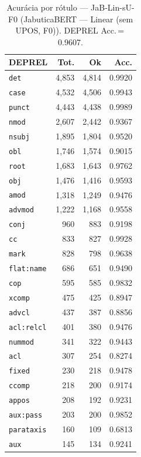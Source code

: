 \begin{table}[ht]
\centering
\caption{Acurácia por rótulo --- JaB-Lin-sU-F0 (JabuticaBERT — Linear (sem UPOS, F0)). DEPREL Acc.\,=\,0.9607.}
\label{tab:acc-predict-test-ablacao-linear-amadeusai-modernJabuticaBERT-Base-1k-fold0}
\scriptsize
\begin{tabular}{lrrr}
\toprule
\textbf{DEPREL} & \textbf{Tot.} & \textbf{Ok} & \textbf{Acc.} \\
\midrule
\texttt{det} & 4,853 & 4,814 & 0.9920 \\
\texttt{case} & 4,532 & 4,506 & 0.9943 \\
\texttt{punct} & 4,443 & 4,438 & 0.9989 \\
\texttt{nmod} & 2,607 & 2,442 & 0.9367 \\
\texttt{nsubj} & 1,895 & 1,804 & 0.9520 \\
\texttt{obl} & 1,746 & 1,574 & 0.9015 \\
\texttt{root} & 1,683 & 1,643 & 0.9762 \\
\texttt{obj} & 1,476 & 1,416 & 0.9593 \\
\texttt{amod} & 1,318 & 1,249 & 0.9476 \\
\texttt{advmod} & 1,222 & 1,168 & 0.9558 \\
\texttt{conj} & 960 & 883 & 0.9198 \\
\texttt{cc} & 833 & 827 & 0.9928 \\
\texttt{mark} & 828 & 798 & 0.9638 \\
\texttt{flat\!:\!name} & 686 & 651 & 0.9490 \\
\texttt{cop} & 595 & 585 & 0.9832 \\
\texttt{xcomp} & 475 & 425 & 0.8947 \\
\texttt{advcl} & 437 & 387 & 0.8856 \\
\texttt{acl\!:\!relcl} & 401 & 380 & 0.9476 \\
\texttt{nummod} & 341 & 322 & 0.9443 \\
\texttt{acl} & 307 & 254 & 0.8274 \\
\texttt{fixed} & 230 & 218 & 0.9478 \\
\texttt{ccomp} & 218 & 200 & 0.9174 \\
\texttt{appos} & 208 & 192 & 0.9231 \\
\texttt{aux\!:\!pass} & 203 & 200 & 0.9852 \\
\texttt{parataxis} & 160 & 109 & 0.6813 \\
\texttt{aux} & 145 & 134 & 0.9241 \\

\end{tabular}
\end{table}

